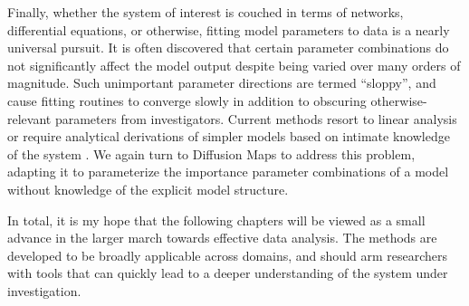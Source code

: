 Finally, whether the system of interest is couched in terms of
networks, differential equations, or otherwise, fitting model
parameters to data is a nearly universal pursuit. It is often
discovered that certain parameter combinations do not significantly
affect the model output despite being varied over many orders of
magnitude. Such unimportant parameter directions are termed
``sloppy'', and cause fitting routines to converge slowly in addition
to obscuring otherwise-relevant parameters from investigators. Current
methods resort to linear analysis or require analytical derivations
of simpler models based on intimate knowledge of the system
\cite{Sensitivity Analysis;,transtrum_model_2014}. We again turn to Diffusion Maps to
address this problem, adapting it to parameterize the importance
parameter combinations of a model without knowledge of the explicit
model structure.

In total, it is my hope that the following chapters will be viewed as
a small advance in the larger march towards effective data
analysis. The methods are developed to be broadly applicable across
domains, and should arm researchers with tools that can quickly lead
to a deeper understanding of the system under investigation.
















